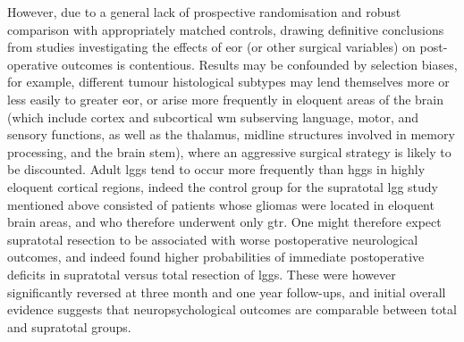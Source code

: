 However, due to a general lack of prospective randomisation and robust comparison with appropriately matched controls, drawing definitive conclusions from studies investigating the effects of \gls{eor} (or other surgical variables) on post-operative outcomes is contentious\autocite{deLeeuw2019,Keles2001}.
Results may be confounded by selection biases, for example, different tumour histological subtypes may lend themselves more or less easily to greater \gls{eor}, or arise more frequently in eloquent areas of the brain (which include cortex and subcortical \gls{wm} subserving language, motor, and sensory functions, as well as the thalamus, midline structures involved in memory processing, and the brain stem), where an aggressive surgical strategy is likely to be discounted\autocite{deLeeuw2019}.
Adult \glspl{lgg} tend to occur more frequently than \glspl{hgg} in highly eloquent cortical regions\autocite{Duffau2004}, indeed the control group for the supratotal \gls{lgg} study\autocite{Yordanova2011} mentioned above consisted of patients whose gliomas were located in eloquent brain areas, and who therefore underwent only \gls{gtr}.
One might therefore expect supratotal resection to be associated with worse postoperative neurological outcomes, and indeed \textcite{Rossi2019a} found higher probabilities of immediate postoperative deficits in supratotal versus total resection of \glspl{lgg}.
These were however significantly reversed at three month and one year follow-ups, and initial overall evidence suggests that neuropsychological outcomes are comparable between total and supratotal groups\autocite{Tabor2021}.

